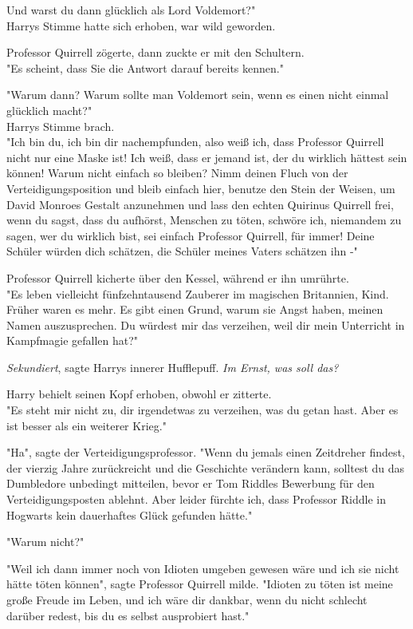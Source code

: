 {Und warst du dann glücklich als Lord Voldemort?"\\ Harrys Stimme hatte sich erhoben, war wild geworden.

Professor Quirrell zögerte, dann zuckte er mit den Schultern.\\ "Es scheint, dass Sie die Antwort darauf bereits kennen."

"Warum dann? Warum sollte man Voldemort sein, wenn es einen nicht einmal glücklich macht?"\\ Harrys Stimme brach.\\ "Ich bin du, ich bin dir nachempfunden, also weiß ich, dass Professor Quirrell nicht nur eine Maske ist! Ich weiß, dass er jemand ist, der du wirklich hättest sein können! Warum nicht einfach so bleiben? Nimm deinen Fluch von der Verteidigungsposition und bleib einfach hier, benutze den Stein der Weisen, um David Monroes Gestalt anzunehmen und lass den echten Quirinus Quirrell frei, wenn du sagst, dass du aufhörst, Menschen zu töten, schwöre ich, niemandem zu sagen, wer du wirklich bist, sei einfach Professor Quirrell, für immer! Deine Schüler würden dich schätzen, die Schüler meines Vaters schätzen ihn -"

Professor Quirrell kicherte über den Kessel, während er ihn umrührte.\\ "Es leben vielleicht fünfzehntausend Zauberer im magischen Britannien, Kind. Früher waren es mehr. Es gibt einen Grund, warum sie Angst haben, meinen Namen auszusprechen. Du würdest mir das verzeihen, weil dir mein Unterricht in Kampfmagie gefallen hat?"

\emph{Sekundiert}, sagte Harrys innerer Hufflepuff. \emph{Im Ernst, was soll das?}

Harry behielt seinen Kopf erhoben, obwohl er zitterte.\\ "Es steht mir nicht zu, dir irgendetwas zu verzeihen, was du getan hast. Aber es ist besser als ein weiterer Krieg."

"Ha", sagte der Verteidigungsprofessor. "Wenn du jemals einen Zeitdreher findest, der vierzig Jahre zurückreicht und die Geschichte verändern kann, solltest du das Dumbledore unbedingt mitteilen, bevor er Tom Riddles Bewerbung für den Verteidigungsposten ablehnt. Aber leider fürchte ich, dass Professor Riddle in Hogwarts kein dauerhaftes Glück gefunden hätte."

"Warum nicht?"

"Weil ich dann immer noch von Idioten umgeben gewesen wäre und ich sie nicht hätte töten können", sagte Professor Quirrell milde. "Idioten zu töten ist meine große Freude im Leben, und ich wäre dir dankbar, wenn du nicht schlecht darüber redest, bis du es selbst ausprobiert hast."

}
